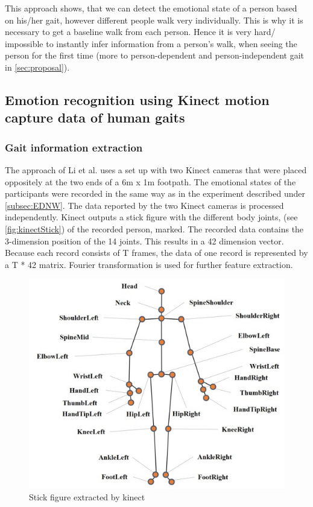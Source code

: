 \documentclass[conference]{IEEEtran}
\begin{document}
This approach shows, that we can detect the emotional state of a person based on his/her gait, however different people walk very individually. This is why it is necessary to get a baseline walk from each person. Hence it is very hard/ impossible to instantly infer information from a person's walk, when seeing the person for the first time (more to person-dependent and person-independent gait in \autoref{sec:proposal}).

\subsection{Emotion recognition using Kinect motion capture data of human gaits}
\label{subsec:LiGait}
\subsubsection{Gait information extraction}
The approach of Li et al.\cite{li2016emotion} uses a set up with two Kinect cameras that were placed oppositely at the two ends of a 6m x 1m footpath. The emotional states of the participants were recorded in the same way as in the experiment described under \autoref{subsec:EDNW}. The data reported by the two Kinect cameras is processed independently. Kinect outputs a stick figure with the different body joints, (see \autoref{fig:kinectStick}) of the recorded person, marked. The recorded data contains the 3-dimension position of the 14 joints. This results in a 42 dimension vector. Because each record consists of T frames, the data of one record is represented by a T * 42 matrix. Fourier transformation is used for further feature extraction. 

\begin{figure}[H]
\centering
\includegraphics[width=\linewidth]{kinectStick.jpg}
\caption{Stick figure extracted by kinect\cite{li2016emotion}}
\label{fig:kinectStick}
\end{figure}
\end{document}

